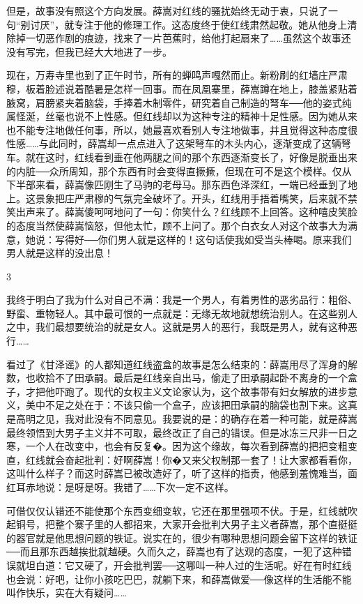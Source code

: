 但是，故事没有照这个方向发展。薛嵩对红线的骚扰始终无动于衷，只说了一句“别讨厌”，就专注于他的修理工作。这态度终于使红线肃然起敬。她从他身上清除掉一切恶作剧的痕迹，找来了一片芭蕉时，给他打起扇来了……虽然这个故事还没有写完，但我已经大大地进了一步。 

现在，万寿寺里也到了正午时节，所有的蝉鸣声嘎然而止。新粉刷的红墙庄严肃穆，板着脸述说着酷暑是怎样一回事。而在凤凰寨里，薛嵩蹲在地上，膝盖紧贴着腋窝，肩膀紧夹着脑袋，手捧着木制零件，研究着自己制造的弩车──他的姿式纯属怪涎，丝毫也说不上性感。但红线却以为这种专注的精神十足性感。因为她从来也不能专注地做任何事，所以，她最喜欢看别人专注地做事，并且觉得这种态度很性感……与此同时，薛嵩却一点点进入了这架弩车的木头内心，逐渐变成了这辆弩车。就在这时，红线看到垂在他两腿之间的那个东西逐渐变长了，好像是脱垂出来的内脏──众所周知，那个东西有时会变得直撅撅，但现在可不是这个模样。仅从下半部来看，薛嵩像匹刚生了马驹的老母马。那东西色泽深红，一端已经垂到了地上。这景象把庄严肃穆的气氛完全破坏了。开头，红线用手捂着嘴笑，后来就不禁笑出声来了。薛嵩傻呵呵地问了一句：你笑什么？红线顾不上回答。这种嘻皮笑脸的态度当然使薛嵩恼怒，但他太忙，顾不上问了。那个白衣女人对这个故事大为满意，她说：写得好──你们男人就是这样的！这句话使我如受当头棒喝。原来我们男人就是这样的没出息！ 

3 

我终于明白了我为什么对自己不满：我是一个男人，有着男性的恶劣品行：粗俗、野蛮、重物轻人。其中最可恨的一点就是：无缘无故地就想统治别人。在这些别人之中，我们最想要统治的就是女人。这就是男人的恶行，我既是男人，就有这种恶行…… 

看过了《甘泽谣》的人都知道红线盗盒的故事是怎么结束的：薛嵩用尽了浑身的解数，也收拾不了田承嗣。最后是红线亲自出马，偷走了田承嗣起卧不离身的一个盒子，才把他吓跑了。现代的女权主义文论家认为，这个故事带有妇女解放的进步意义，美中不足之处在于：不该只偷一个盒子，应该把田承嗣的脑袋也割下来。这真是高明之见，我对此没有不同意见。我要说的是：的确存在着一种可能，就是薛嵩最终领悟到大男子主义并不可取，最终改正了自己的错误。但是冰冻三尺非一日之寒，一个人在改变中，也会有反复�。因为这个缘故，每次看到薛嵩的把把变粗变直，红线就会奋起批判：好啊薛嵩！你�又来父权制那一套了！让大家都看看你，这叫什么样子？而这时薛嵩已被改造好了，听了这样的指责，他感到羞愧难当，面红耳赤地说：是呀是呀。我错了……下次一定不这样。 

可借仅仅认错还不能使那个东西变细变软，它还在那里强项不伏。于是，红线就吹起铜号，把整个寨子里的人都招来，大家开会批判大男子主义者薛嵩，那个直挺挺的器官就是他思想问题的铁证。说实在的，很少有哪种思想问题会留下这样的铁证──而且那东西越挨批就越硬。久而久之，薛嵩也有了达观的态度，一犯了这种错误就坦白道：它又硬了，开会批判罢──这哪叫一种人过的生活呢。好在有时红线也会说：好吧，让你小孩吃巴巴，就躺下来，和薛嵩做爱──像这样的生活能不能叫作快乐，实在大有疑问…… 

